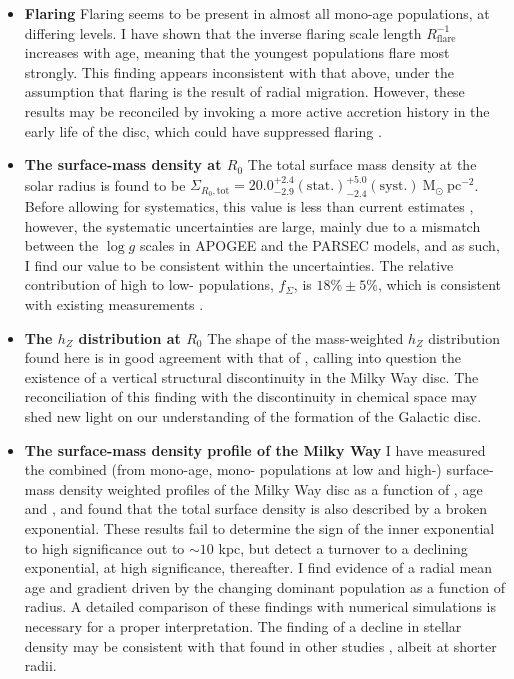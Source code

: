 \begin{itemize}
\item \textbf{Flaring} Flaring seems to be present in almost all mono-age populations, at differing levels. I have shown that the inverse flaring scale length $R_{\mathrm{flare}}^{-1}$ increases with age, meaning that the youngest populations flare most strongly. This finding appears inconsistent with that above, under the assumption that flaring is the result of radial migration. However, these results may be reconciled by invoking a more active accretion history in the early life of the disc, which could have suppressed flaring \citep[e.g.][]{2014ApJ...781L..20M}.
\item \textbf{The surface-mass density at $R_0$} The total surface mass density at the solar radius is found to be  $\Sigma_{R_0, \text{tot}} = 20.0_{-2.9}^{+2.4}\mathrm{(stat.)}_{-2.4}^{+5.0}\mathrm{(syst.)}\ \mathrm{M_{\odot} \ pc^{-2}}$. Before allowing for systematics, this value is less than current estimates \citep[e.g.][]{2012ApJ...751..131B,2006MNRAS.372.1149F,2015ApJ...814...13M}, however, the systematic uncertainties are large, mainly due to a mismatch between the $\log{g}$ scales in APOGEE and the PARSEC models, and as such, I find our value to be consistent within the uncertainties. The relative contribution of high to low-\afe{} populations, $f_\Sigma$, is $18\% \pm 5\%$, which is consistent with existing measurements \citep[e.g.][]{2016ARA&A..54..529B}. 
\item \textbf{The $h_Z$ distribution at $R_0$} The shape of the mass-weighted $h_Z$ distribution found here is in good agreement with that of \citet{2012ApJ...751..131B}, calling into question the existence of a vertical structural discontinuity in the Milky Way disc. The reconciliation of this finding with the discontinuity in chemical space \citep[e.g. the bimodality in \afe{} at fixed \feh{}:][]{2015ApJ...808..132H,2014ApJ...796...38N} may shed new light on our understanding of the formation of the Galactic disc.
\item \textbf{The surface-mass density profile of the Milky Way} I have measured the combined (from mono-age, mono-\feh{} populations at low and high-\afe{}) surface-mass density weighted profiles of the Milky Way disc as a function of \afe{}, age and \feh{}, and found that the total surface density is also described by a broken exponential. These results fail to determine the sign of the inner exponential to high significance out to $\sim 10$ kpc, but detect a turnover to a declining exponential, at high significance, thereafter. I find evidence of a radial mean age and \feh{} gradient driven by the changing dominant population as a function of radius. A detailed comparison of these findings with numerical simulations is necessary for a proper interpretation. The finding of a decline in stellar density may be consistent with that found in other studies \citep[e.g.][]{2009A&A...495..819R,2010MNRAS.402..713S}, albeit at shorter radii.
\end{itemize}

